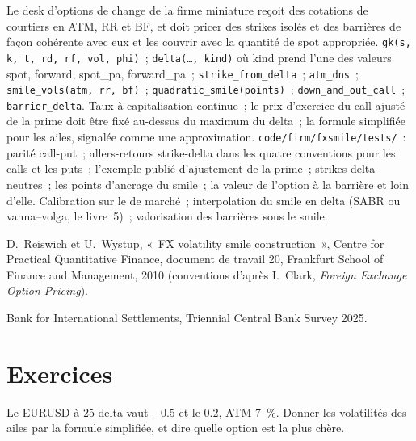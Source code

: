 \begin{build}
 Le desk d'options de change de la firme miniature reçoit des cotations de courtiers en
ATM, RR et BF, et doit pricer des strikes isolés et des barrières de façon cohérente avec eux
et les couvrir avec la quantité de spot appropriée.
 \texttt{gk(s, k, t, rd, rf, vol, phi)}~; \texttt{delta(\ldots,
kind)} où kind prend l'une des valeurs spot, forward, spot\_pa, forward\_pa~;
\texttt{strike\_from\_delta}~; \texttt{atm\_dns}~; \texttt{smile\_vols(atm, rr, bf)}~;
\texttt{quadratic\_smile(points)}~; \texttt{down\_and\_out\_call}~;
\texttt{barrier\_delta}.
 Taux à capitalisation continue~; le prix d'exercice du call ajusté de la prime
doit être fixé au-dessus du maximum du delta~; la formule simplifiée pour les ailes, signalée comme
une approximation.
 \texttt{code/firm/fxsmile/tests/}~: parité call-put~;
allers-retours strike-delta dans les quatre conventions pour les calls et les puts~;
l'exemple publié d'ajustement de la prime~; strikes delta-neutres~; les points d'ancrage
du smile~; la valeur de l'option à la barrière et loin d'elle.
 Calibration sur le  de marché~; interpolation du smile en delta
(SABR ou vanna--volga, le livre~5)~; valorisation des barrières sous le smile.
\end{build}

\begin{omsources}
\item D.~Reiswich et U.~Wystup, «~FX volatility smile construction~», Centre for
Practical Quantitative Finance, document de travail 20, Frankfurt School of Finance and
Management, 2010 (conventions d'après I.~Clark, \emph{Foreign Exchange Option
Pricing}).
\item Bank for International Settlements, Triennial Central Bank Survey 2025.
\end{omsources}

\section{Exercices}

\begin{exercise}[$\star$]\label{exo:m2:the-fx-options-market:1}
Le  EURUSD à 25 delta vaut $-0.5$ et le  0.2, ATM 7~\%. Donner les
volatilités des ailes par la formule simplifiée, et dire quelle option est la plus chère.
\end{exercise}


